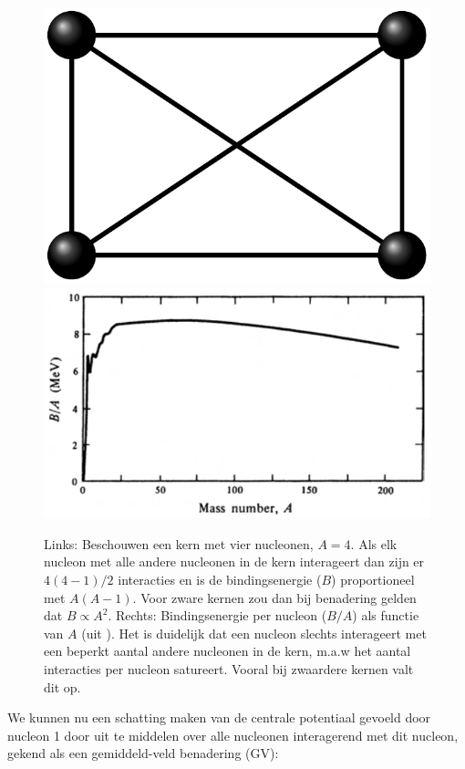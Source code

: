 \documentclass[11pt,twoside]{book}
\begin{document}
\begin{figure}
\centering 
\includegraphics[scale=0.55]{./figuren/saturation}
\includegraphics[scale=0.45]{./figuren/binding_energy.png}
\caption{Links: Beschouwen een kern met vier nucleonen, $A = 4$. Als elk nucleon met alle andere nucleonen in de kern interageert dan zijn er $4(4-1)/2$ interacties en is de bindingsenergie ($B$) proportioneel met $A(A-1)$. Voor zware kernen zou dan bij benadering gelden dat $B \propto A^2$. Rechts: Bindingsenergie per nucleon ($B/A$) als functie van $A$ (uit \cite{henley}). Het is duidelijk dat een nucleon slechts interageert met een beperkt aantal andere nucleonen in de kern, m.a.w het aantal interacties per nucleon satureert. Vooral bij zwaardere kernen valt dit op.}
\label{fig:bindings_energie}
\end{figure}
We kunnen nu een schatting maken van de centrale potentiaal gevoeld door nucleon 1 door uit te middelen over alle nucleonen interagerend met dit nucleon, gekend als een gemiddeld-veld benadering (GV):
\end{document}
